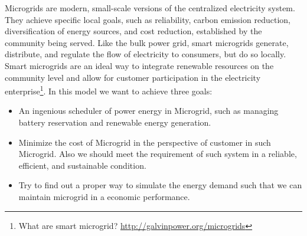 	Microgrids are modern, small-scale versions of the centralized electricity system. They achieve specific local goals, such as reliability, carbon emission reduction, diversification of energy sources, and cost reduction, established by the community being served. Like the bulk power grid, smart microgrids generate, distribute, and regulate the flow of electricity to consumers, but do so locally. Smart microgrids are an ideal way to integrate renewable resources on the community level and allow for customer participation in the electricity enterprise\footnote{What are smart microgrid? \url{http://galvinpower.org/microgrids}}. 
	In this model we want to achieve three goals:
	\begin{itemize}
	\item An ingenious scheduler of power energy in Microgrid, such as managing battery reservation and renewable energy generation. 
	\item Minimize the cost of Microgrid in the perspective of customer in such Microgrid. Also we should meet the requirement of such system in a reliable, efficient, and sustainable condition.
	\item Try to find out a proper way to simulate the energy demand such that we can maintain microgrid in a economic performance. 
	\end{itemize}
	
	\clearpage
	